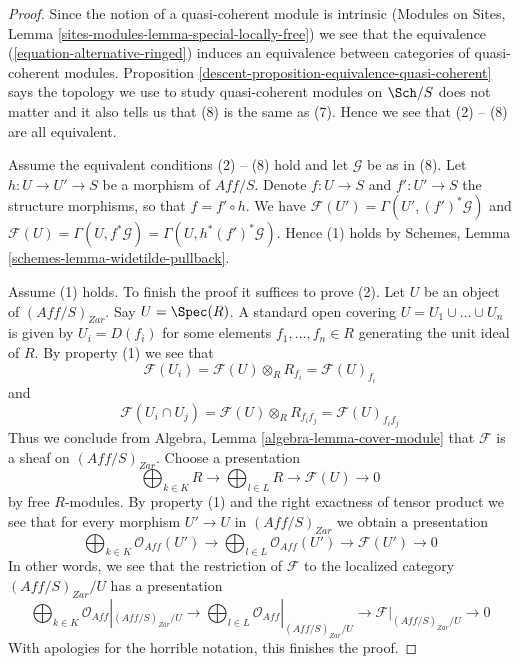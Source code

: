 \begin{proof}

Since the notion of a quasi-coherent module is intrinsic
(Modules on Sites, Lemma \ref{sites-modules-lemma-special-locally-free})
we see that the equivalence (\ref{equation-alternative-ringed})
induces an equivalence between categories of quasi-coherent modules.
Proposition \ref{descent-proposition-equivalence-quasi-coherent}
says the topology we use to study quasi-coherent modules on
$\Sch/S$ does not matter and it also tells us that (8)
is the same as (7). Hence we see that (2) -- (8) are all equivalent.

\medskip\noindent
Assume the equivalent conditions (2) -- (8) hold and let
$\mathcal{G}$ be as in (8). Let $h : U \to U' \to S$ be a morphism
of $\textit{Aff}/S$. Denote $f : U \to S$ and $f' : U' \to S$ the
structure morphisms, so that $f = f' \circ h$.
We have $\mathcal{F}(U') = \Gamma(U', (f')^*\mathcal{G})$ and
$\mathcal{F}(U) = \Gamma(U, f^*\mathcal{G}) = \Gamma(U, h^*(f')^*\mathcal{G})$.
Hence (1) holds by Schemes, Lemma \ref{schemes-lemma-widetilde-pullback}.

\medskip\noindent
Assume (1) holds. To finish the proof it suffices to prove (2).
Let $U$ be an object of $(\textit{Aff}/S)_{Zar}$.
Say $U = \Spec(R)$. A standard open covering $U = U_1 \cup \ldots \cup U_n$
is given by $U_i = D(f_i)$ for some elements $f_1, \ldots, f_n \in R$
generating the unit ideal of $R$. By property (1) we see that
$$
\mathcal{F}(U_i) =
\mathcal{F}(U) \otimes_R R_{f_i} =
\mathcal{F}(U)_{f_i}
$$
and
$$
\mathcal{F}(U_i \cap U_j) =
\mathcal{F}(U) \otimes_R R_{f_if_j} =
\mathcal{F}(U)_{f_if_j}
$$
Thus we conclude from Algebra, Lemma \ref{algebra-lemma-cover-module}
that $\mathcal{F}$ is a sheaf on $(\textit{Aff}/S)_{Zar}$. Choose a
presentation
$$
\bigoplus\nolimits_{k \in K} R
\longrightarrow
\bigoplus\nolimits_{l \in L} R
\longrightarrow
\mathcal{F}(U)
\longrightarrow 0
$$
by free $R$-modules. By property (1) and the right exactness of tensor product
we see that for every morphism $U' \to U$ in $(\textit{Aff}/S)_{Zar}$
we obtain a presentation
$$
\bigoplus\nolimits_{k \in K} \mathcal{O}_{Aff}(U')
\longrightarrow
\bigoplus\nolimits_{l \in L} \mathcal{O}_{Aff}(U')
\longrightarrow
\mathcal{F}(U')
\longrightarrow 0
$$
In other words, we see that the restriction of $\mathcal{F}$
to the localized category $(\textit{Aff}/S)_{Zar}/U$ has a presentation
$$
\bigoplus\nolimits_{k \in K} \mathcal{O}_{Aff}|_{(\textit{Aff}/S)_{Zar}/U}
\longrightarrow
\bigoplus\nolimits_{l \in L} \mathcal{O}_{Aff}|_{(\textit{Aff}/S)_{Zar}/U}
\longrightarrow
\mathcal{F}|_{(\textit{Aff}/S)_{Zar}/U}
\longrightarrow 0
$$
With apologies for the horrible notation, this finishes the proof.
\end{proof}

